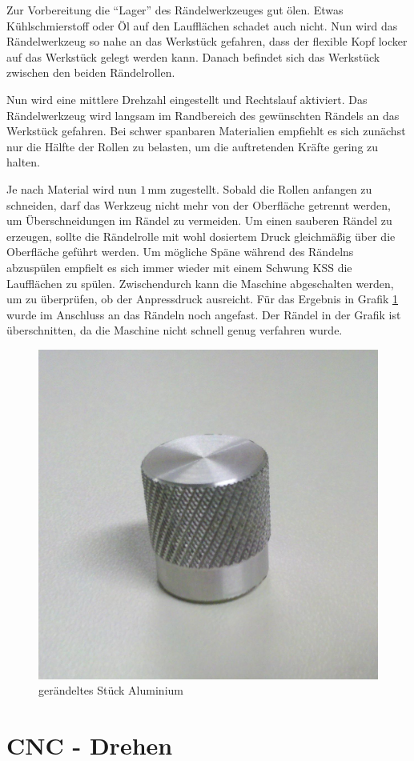 \documentclass{\basedir/fablab-document}
\begin{document}
Zur Vorbereitung die \enquote{Lager} des Rändelwerkzeuges gut ölen.
Etwas Kühlschmierstoff oder Öl auf den Laufflächen schadet auch nicht. 
Nun wird das Rändelwerkzeug so nahe an das Werkstück gefahren, dass der flexible Kopf locker auf das Werkstück gelegt werden kann.
Danach befindet sich das Werkstück zwischen den beiden Rändelrollen.

Nun wird eine mittlere Drehzahl eingestellt und Rechtslauf aktiviert. 
Das Rändelwerkzeug wird langsam im Randbereich des gewünschten Rändels an das Werkstück gefahren. 
Bei schwer spanbaren Materialien empfiehlt es sich zunächst nur die Hälfte der Rollen zu belasten, um die auftretenden Kräfte gering zu halten.

Je nach Material wird nun $1$\,mm zugestellt. Sobald die Rollen anfangen zu schneiden, darf das Werkzeug nicht mehr von der Oberfläche getrennt werden, um Überschneidungen im Rändel zu vermeiden.
Um einen sauberen Rändel zu erzeugen, sollte die Rändelrolle mit wohl dosiertem Druck gleichmäßig über die Oberfläche geführt werden.
Um mögliche Späne während des Rändelns abzuspülen empfielt es sich immer wieder mit einem Schwung KSS die Laufflächen zu spülen.
Zwischendurch kann die Maschine abgeschalten werden, um zu überprüfen, ob der Anpressdruck ausreicht.
Für das Ergebnis in Grafik \ref{fig:raendel} wurde im Anschluss an das Rändeln noch angefast.
Der Rändel in der Grafik ist überschnitten, da die Maschine nicht schnell genug verfahren wurde.

\begin{figure}[hb]
\caption{gerändeltes Stück Aluminium}
\label{fig:raendel}
\centering
\includegraphics[width=.5\linewidth]{img/raendel}
\end{figure}
\newpage
\section{CNC - Drehen}
\end{document}
